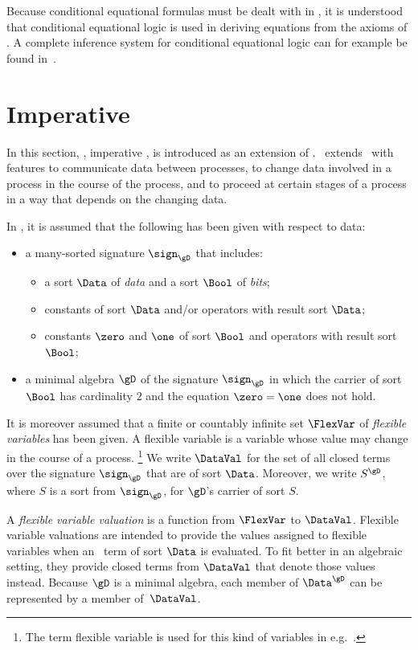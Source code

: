 \documentclass[runningheads]{llncs}
\begin{document}
Because conditional equational formulas must be dealt with in \ACPei, 
it is understood that conditional equational logic is used in deriving 
equations from the axioms of \ACPei.
A complete inference system for conditional equational logic can for
example be found in~\cite{BW90,Gog21a}.

\section{Imperative \ACPei}
\label{sect-deACPei}

In this section, \deACPei, imperative \ACPei, is introduced as an 
extension of \ACPei.
\deACPei\ extends \ACPei\ with features to communicate data between 
processes, to change data involved in a process in the course of the 
process, and to proceed at certain stages of a process in a way that 
depends on the changing data. 

In \deACPei, it is assumed that the following has been given with 
respect to data:
\begin{itemize}
\item
a many-sorted signature $\sign_\gD$ that includes:
\begin{itemize}
\item
a sort $\Data$ of \emph{data} and
a sort $\Bool$ of \emph{bits};
\item
constants of sort $\Data$ and/or operators with result sort $\Data$;
\item
constants $\zero$ and $\one$ of sort $\Bool$ and
operators with result sort $\Bool$;
\end{itemize}
\item
a minimal algebra $\gD$ of the signature $\sign_\gD$ in which 
the carrier of sort $\Bool$ has cardinality $2$ and 
the equation $\zero = \one$ does not hold.
\end{itemize}
It is moreover assumed that a finite or countably infinite set 
$\FlexVar$ of \emph{flexible variables} has been given.
A flexible variable is a variable whose value may change in the course 
of a process.%
\footnote
{The term flexible variable is used for this kind of variables in 
 e.g.~\cite{Sch97a,Lam94a}.} 
%
We write $\DataVal$ for the set of all closed terms over the signature
$\sign_\gD$ that are of sort $\Data$.
Moreover, we write $S^\gD$, where $S$ is a sort from $\sign_\gD$, for
$\gD$'s carrier of sort $S$.

A \emph{flexible variable valuation} is a function from $\FlexVar$ to 
$\DataVal$. 
% 
Flexible variable valuations are intended to provide the values assigned to 
flexible variables when an \deACPei\ term of sort $\Data$ is evaluated.
To fit better in an algebraic setting, they provide closed terms from 
$\DataVal$ that denote those values instead.
Because $\gD$ is a minimal algebra, each member of $\Data^\gD$ can be 
represented by a member of~$\DataVal$. 
\end{document}
